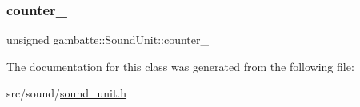 \subsubsection{\texorpdfstring{counter\+\_\+}{counter\_}}
{\footnotesize\ttfamily unsigned gambatte\+::\+Sound\+Unit\+::counter\+\_\+\hspace{0.3cm}{\ttfamily [protected]}}



The documentation for this class was generated from the following file\+:\begin{DoxyCompactItemize}
\item 
src/sound/\hyperlink{sound__unit_8h}{sound\+\_\+unit.\+h}\end{DoxyCompactItemize}
